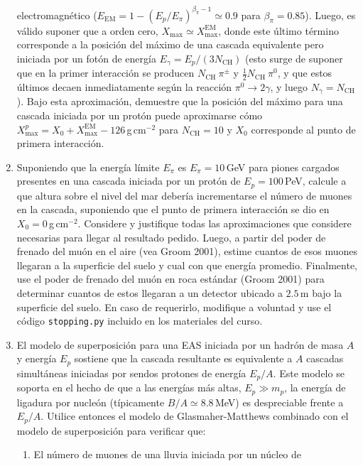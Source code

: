 \documentclass[11pt]{article}
\begin{document}
\begin{enumerate}
		electromagnético ($E_{\mathrm{EM}} = 1 - (E_p/E_\pi)^{\beta_\pi - 1}
		\simeq 0.9$ para $\beta_\pi=0.85$). Luego, es válido suponer que a
		orden cero, $X_{\max} \simeq X_{\max}^{\mathrm{EM}}$, donde este último
		término corresponde a la posición del máximo de una cascada equivalente
		pero iniciada por un fotón de energía $E_\gamma=E_p / (3
		N_{\mathrm{CH}})$ (esto surge de suponer que en la primer interacción
		se producen $N_{\mathrm{CH}}\ \pi^\pm$ y $\frac12 N_{\mathrm{CH}}\
		\pi^0$, y que estos últimos decaen inmediatamente según la reacción
		$\pi^0 \to 2\gamma$, y luego $N_\gamma=N_{\mathrm{CH}}$). Bajo esta
		aproximación, demuestre que la posición del máximo para una cascada
		iniciada por un protón puede aproximarse cómo $X_{\max}^p = X_0 +
		X_{\max}^{\mathrm{EM}} - 126$\,g\,cm$^{-2}$ para $N_{\mathrm{CH}}=10$ y
		$X_0$ corresponde al punto de primera interacción.
	\item Suponiendo que la energía límite $E_\pi$ es $E_\pi=10$\,GeV para
		piones cargados presentes en una cascada iniciada por un protón de
		$E_p=100$\,PeV, calcule a que altura sobre el nivel del mar debería
		incrementarse el número de muones en la cascada, suponiendo que el
		punto de primera interacción se dio en $X_0=0$\,g\,cm$^{-2}$. Considere
		y justifique todas las aproximaciones que considere necesarias para
		llegar al resultado pedido. Luego, a partir del poder de frenado del
		muón en el aire (vea Groom 2001), estime cuantos de esos muones
		llegaran a la superficie del suelo y cual con que energía promedio.
		Finalmente, use el poder de frenado del muón en roca estándar (Groom
		2001) para determinar cuantos de estos llegaran a un detector ubicado a
		$2.5$\,m bajo la superficie del suelo. En caso de requerirlo, modifique
		a voluntad y use el código {\texttt{stopping.py}} incluido en los
		materiales del curso. 
	\item El modelo de superposición para una EAS iniciada por un hadrón de
		masa $A$ y energía $E_p$ sostiene que la cascada resultante es
		equivalente a $A$ cascadas simultáneas iniciadas por sendos protones de
		energía $E_p/A$.  Este modelo se soporta en el hecho de que a las
		energías más altas, $E_p \gg m_p$, la energía de ligadura por nucleón
		(típicamente $B/A\simeq 8.8$\,MeV) es despreciable frente a $E_p/A$.
		Utilice entonces el modelo de Glasmaher-Matthews combinado con el
		modelo de superposición para verificar que:
		\begin{enumerate}
			\item El número de muones de una lluvia iniciada por un núcleo de

\end{enumerate}
\end{enumerate}
\end{document}
